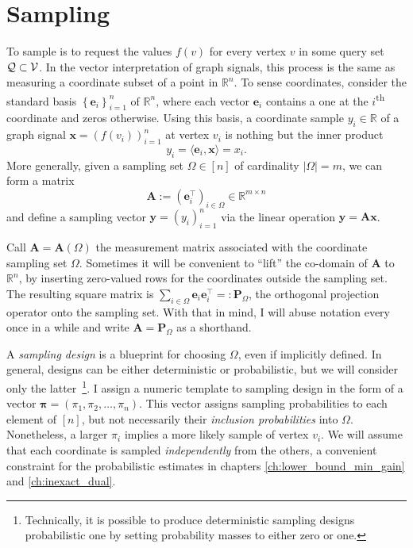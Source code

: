 \section{Sampling}\label{sec:sampling}

To sample is to request the values $f(v)$ for every vertex $v$ in some query set $\mathcal{Q} \subset \mathcal{V}$. In the vector interpretation of graph signals, this process is the same as measuring a coordinate subset of a point in $\mathbb{R}^{n}$. To sense coordinates, consider the standard basis $\left\{\mathbf{e}_i\right\}_{i=1}^n$ of $\mathbb{R}^{n}$, where each vector $\mathbf{e}_i$ contains a one at the $i$\textsuperscript{th} coordinate and zeros otherwise. Using this basis, a coordinate sample $y_i \in \mathbb{R}$ of a graph signal $\mathbf{x} = (f(v_i))_{i=1}^n$ at vertex $v_i$ is nothing but the inner product
\begin{equation*}
    y_i = \langle \mathbf{e}_i, \mathbf{x} \rangle = x_i.
\end{equation*}
More generally, given a sampling set $\Omega \in [n]$ of cardinality $|\Omega| = m$, we can form a matrix
\begin{equation}
    \mathbf{A} := \left( \mathbf{e}_i^\top \right)_{i \in \Omega} \in \mathbb{R}^{m \times n}
\end{equation}
and define a sampling vector $\mathbf{y} = (y_i)_{i=1}^n$ via the linear operation $\mathbf{y} = \mathbf{Ax}$.

Call $\mathbf{A} = \mathbf{A}(\Omega)$ the measurement matrix associated with the coordinate sampling set $\Omega$. Sometimes it will be convenient to ``lift'' the co-domain of $\mathbf{A}$ to $\mathbb{R}^{n}$, by inserting zero-valued rows for the coordinates outside the sampling set. The resulting square matrix is $\sum_{i \in \Omega} \mathbf{e}_i \mathbf{e}_i^\top =: \mathbf{P}_{\Omega}$, the orthogonal projection operator onto the sampling set. With that in mind, I will abuse notation every once in a while and write $\mathbf{A} = \mathbf{P}_{\Omega}$ as a shorthand.

A \emph{sampling design} is a blueprint for choosing $\Omega$, even if implicitly defined. In general, designs can be either deterministic or probabilistic, but we will consider only the latter~\footnote{Technically, it is possible to produce deterministic sampling designs probabilistic one by setting probability masses to either zero or one.}. I assign a numeric template to sampling design in the form of a vector $\bm{\pi} = (\pi_1, \pi_2, \dots, \pi_n)$. This vector assigns sampling probabilities to each element of $[n]$, but not necessarily their \emph{inclusion probabilities} into $\Omega$. Nonetheless, a larger $\pi_i$ implies a more likely sample of vertex $v_i$. We will assume that each coordinate is sampled \emph{independently} from the others, a convenient constraint for the probabilistic estimates in chapters \ref{ch:lower_bound_min_gain} and \ref{ch:inexact_dual}.

